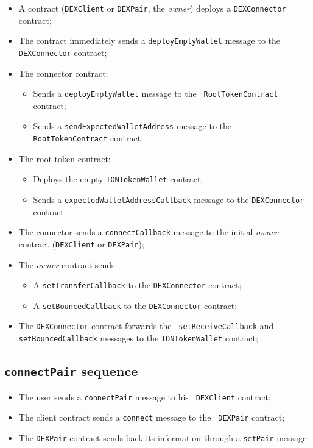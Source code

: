 \begin{itemize}
\item A contract ({\tt DEXClient} or {\tt DEXPair}, the {\em
  owner}) deploys a {\tt DEXConnector} contract;
\item The contract immediately sends a {\tt deployEmptyWallet} message
  to the {\tt DEXConnector} contract;
\item The connector contract:
  \begin{itemize}
  \item Sends a {\tt deployEmptyWallet} message to the {\tt
    RootTokenContract} contract;
  \item Sends a {\tt sendExpectedWalletAddress} message to the {\tt
    RootTokenContract} contract;
  \end{itemize}
\item The root token contract:
  \begin{itemize}
  \item Deploys the empty {\tt TONTokenWallet} contract;
  \item Sends a {\tt expectedWalletAddressCallback} message to the
    {\tt DEXConnector} contract
  \end{itemize}
\item The connector sends a {\tt connectCallback} message to the
  initial {\em owner} contract ({\tt DEXClient} or {\tt DEXPair});
\item The {\em owner} contract sends:
  \begin{itemize}
  \item A {\tt setTransferCallback} to the {\tt DEXConnector} contract;
  \item A {\tt setBouncedCallback} to the {\tt DEXConnector} contract;
  \end{itemize}
\item The {\tt DEXConnector} contract forwards the {\tt
  setReceiveCallback} and {\tt setBouncedCallback} messages to the
  {\tt TONTokenWallet} contract;
\end{itemize}

\subsection{{\tt connectPair} sequence}

\begin{itemize}
\item The user sends a {\tt connectPair} message to his {\tt
  DEXClient} contract;
\item The client contract sends a {\tt connect} message to the {\tt
  DEXPair} contract;
\item The {\tt DEXPair} contract sends back its information through a
  {\tt setPair} message;
\end{itemize}

